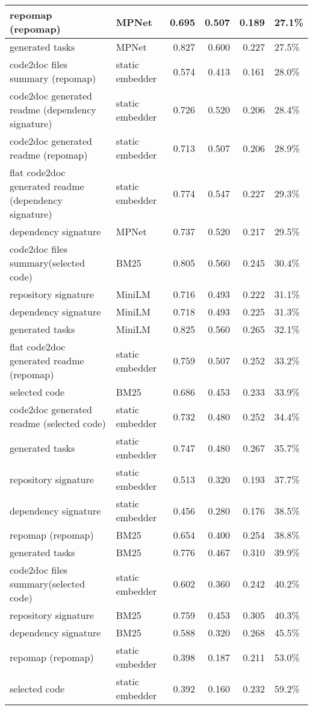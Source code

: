 \begin{tabular}{||l|l|r|r|r|l||}
\hline
{\color{cyan} repomap (repomap)} & MPNet & 0.695 & 0.507 & 0.189 & 27.1\% \\
\hline
generated tasks & MPNet & 0.827 & 0.600 & 0.227 & 27.5\% \\
\hline
{\color{cyan} code2doc files summary (repomap)} & static embedder & 0.574 & 0.413 & 0.161 & 28.0\% \\
\hline
{\color{blue} code2doc generated readme (dependency signature)} & static embedder & 0.726 & 0.520 & 0.206 & 28.4\% \\
\hline
{\color{cyan} code2doc generated readme (repomap)} & static embedder & 0.713 & 0.507 & 0.206 & 28.9\% \\
\hline
{\color{blue} flat code2doc generated readme (dependency signature)} & static embedder & 0.774 & 0.547 & 0.227 & 29.3\% \\
\hline
{\color{red} dependency signature} & MPNet & 0.737 & 0.520 & 0.217 & 29.5\% \\
\hline
{\color{green} code2doc files summary(selected code)} & BM25 & 0.805 & 0.560 & 0.245 & 30.4\% \\
\hline
{\color{red} repository signature} & MiniLM & 0.716 & 0.493 & 0.222 & 31.1\% \\
\hline
{\color{red} dependency signature} & MiniLM & 0.718 & 0.493 & 0.225 & 31.3\% \\
\hline
generated tasks & MiniLM & 0.825 & 0.560 & 0.265 & 32.1\% \\
\hline
{\color{cyan} flat code2doc generated readme (repomap)} & static embedder & 0.759 & 0.507 & 0.252 & 33.2\% \\
\hline
selected code & BM25 & 0.686 & 0.453 & 0.233 & 33.9\% \\
\hline
{\color{green} code2doc generated readme (selected code)} & static embedder & 0.732 & 0.480 & 0.252 & 34.4\% \\
\hline
generated tasks & static embedder & 0.747 & 0.480 & 0.267 & 35.7\% \\
\hline
{\color{red} repository signature} & static embedder & 0.513 & 0.320 & 0.193 & 37.7\% \\
\hline
{\color{red} dependency signature} & static embedder & 0.456 & 0.280 & 0.176 & 38.5\% \\
\hline
{\color{cyan} repomap (repomap)} & BM25 & 0.654 & 0.400 & 0.254 & 38.8\% \\
\hline
generated tasks & BM25 & 0.776 & 0.467 & 0.310 & 39.9\% \\
\hline
{\color{green} code2doc files summary(selected code)} & static embedder & 0.602 & 0.360 & 0.242 & 40.2\% \\
\hline
{\color{red} repository signature} & BM25 & 0.759 & 0.453 & 0.305 & 40.3\% \\
\hline
{\color{red} dependency signature} & BM25 & 0.588 & 0.320 & 0.268 & 45.5\% \\
\hline
{\color{cyan} repomap (repomap)} & static embedder & 0.398 & 0.187 & 0.211 & 53.0\% \\
\hline
selected code & static embedder & 0.392 & 0.160 & 0.232 & 59.2\% \\
\hline
\hline
\bottomrule
\end{tabular}
